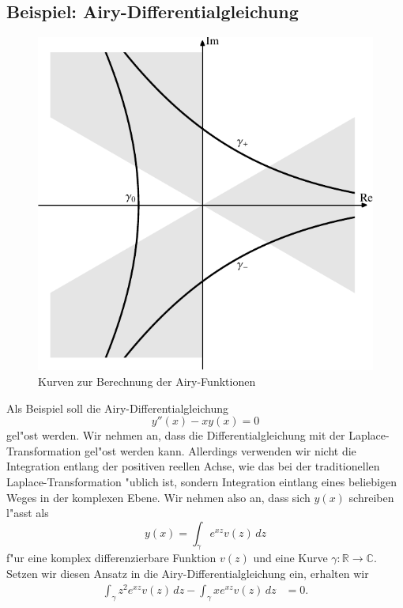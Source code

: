 \subsection{Beispiel: Airy-Differentialgleichung}
\label{komplex:airydgl}
%
\begin{figure}
\centering
\includegraphics{chapters/images/airy-1.pdf}
\caption{Kurven zur Berechnung der Airy-Funktionen
\label{komplex:airy}}
\end{figure}
Als Beispiel soll die Airy-Differentialgleichung
\[
y''(x)-xy(x)=0
\]
gel"ost werden.
Wir nehmen an, dass die Differentialgleichung mit der Laplace-Transformation
%
gel"ost werden kann.
Allerdings verwenden wir nicht die Integration entlang der positiven
reellen Achse, wie das bei der traditionellen Laplace-Transformation
"ublich ist, sondern Integration eintlang eines beliebigen Weges in
der komplexen Ebene.
Wir nehmen also an, dass sich $y(x)$ schreiben l"asst als
\[
y(x)=\int_\gamma e^{xz}v(z)\,dz
\]
f"ur eine komplex differenzierbare Funktion $v(z)$ und eine Kurve
$\gamma\colon\mathbb R\to \mathbb C$.
Setzen wir diesen Ansatz in die Airy-Differentialgleichung ein,
erhalten wir
\begin{align*}
\int_\gamma z^2e^{xz}v(z)\,dz-\int_\gamma xe^{xz}v(z)\,dz&=0.
\end{align*}
